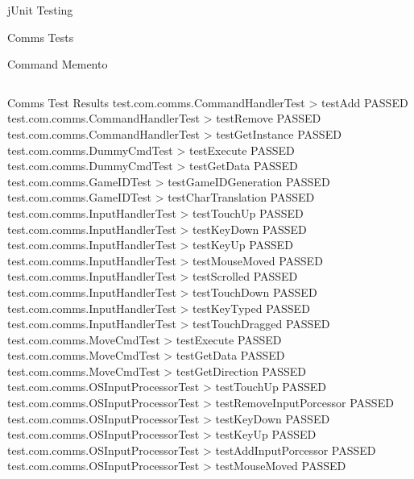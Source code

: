 \documentclass[12pt]{report}
\begin{document}
\begin{chapter}{jUnit Testing}
\begin{section}{Comms Tests}
\begin{subsection}{Command Memento}
\begin{lstlisting}
    \end{lstlisting}
   \end{subsection}
  \end{section}
  \begin{section}{Comms Test Results}
  	test.com.comms.CommandHandlerTest > testAdd PASSED\\
	test.com.comms.CommandHandlerTest > testRemove PASSED\\
	test.com.comms.CommandHandlerTest > testGetInstance PASSED\\
  	test.com.comms.DummyCmdTest > testExecute PASSED\\
  	test.com.comms.DummyCmdTest > testGetData PASSED\\
  	test.com.comms.GameIDTest > testGameIDGeneration PASSED\\
  	test.com.comms.GameIDTest > testCharTranslation PASSED\\
  	test.com.comms.InputHandlerTest > testTouchUp PASSED\\
  	test.com.comms.InputHandlerTest > testKeyDown PASSED\\
  	test.com.comms.InputHandlerTest > testKeyUp PASSED\\
  	test.com.comms.InputHandlerTest > testMouseMoved PASSED\\
  	test.com.comms.InputHandlerTest > testScrolled PASSED\\
  	test.com.comms.InputHandlerTest > testTouchDown PASSED\\
  	test.com.comms.InputHandlerTest > testKeyTyped PASSED\\
  	test.com.comms.InputHandlerTest > testTouchDragged PASSED\\
  	test.com.comms.MoveCmdTest > testExecute PASSED\\
  	test.com.comms.MoveCmdTest > testGetData PASSED\\
  	test.com.comms.MoveCmdTest > testGetDirection PASSED\\
  	test.com.comms.OSInputProcessorTest > testTouchUp PASSED\\
  	test.com.comms.OSInputProcessorTest > testRemoveInputPorcessor PASSED\\
  	test.com.comms.OSInputProcessorTest > testKeyDown PASSED\\
  	test.com.comms.OSInputProcessorTest > testKeyUp PASSED\\
  	test.com.comms.OSInputProcessorTest > testAddInputPorcessor PASSED\\
  	test.com.comms.OSInputProcessorTest > testMouseMoved PASSED\\

\end{section}
\end{chapter}
\end{document}
